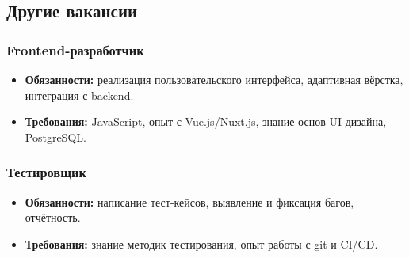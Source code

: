 \documentclass[14pt, russian]{matmex-diploma-custom}
\begin{document}


\subsection{Другие вакансии}

\subsubsection{Frontend-разработчик}
\begin{itemize}
  \item \textbf{Обязанности:} реализация пользовательского интерфейса, адаптивная вёрстка, интеграция с backend.
  \item \textbf{Требования:} JavaScript, опыт с Vue.js/Nuxt.js, знание основ UI-дизайна, PostgreSQL.
\end{itemize}

\subsubsection{Тестировщик}
\begin{itemize}
  \item \textbf{Обязанности:} написание тест-кейсов, выявление и фиксация багов, отчётность.
  \item \textbf{Требования:} знание методик тестирования, опыт работы с git и CI/CD.
\end{itemize}
\end{document}
